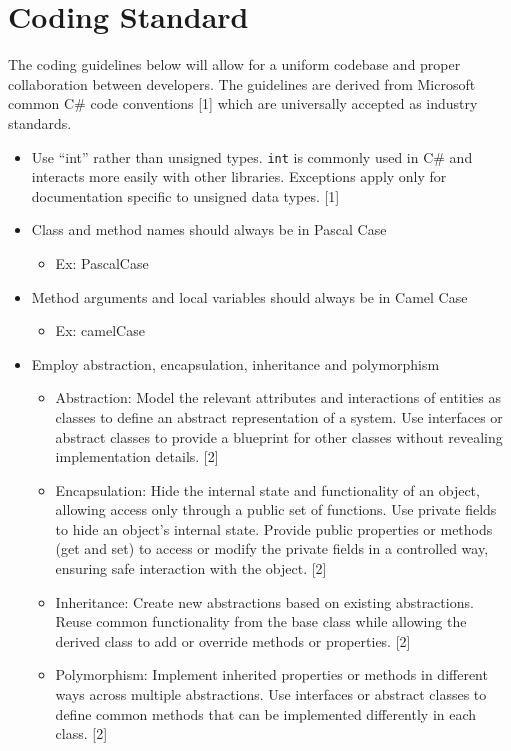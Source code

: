 \documentclass{article}
\begin{document}
\section{Coding Standard}


The coding guidelines below will allow for a uniform codebase and proper collaboration between developers. The guidelines are derived from Microsoft common C\# code conventions [1] which are universally accepted as industry standards.

\begin{itemize}

  \item Use ``int'' rather than unsigned types. \texttt{int} is commonly used in C\# and interacts more easily with other libraries. Exceptions apply only for documentation specific to unsigned data types. [1]
  \item Class and method names should always be in Pascal Case
  \begin{itemize}
    \item Ex: PascalCase
  \end{itemize}
  \item Method arguments and local variables should always be in Camel Case
  \begin{itemize}
    \item Ex: camelCase
  \end{itemize}
  \item Employ abstraction, encapsulation, inheritance and polymorphism

  \begin{itemize}
    \item Abstraction: Model the relevant attributes and interactions of entities as classes to define an abstract representation of a system. Use interfaces or abstract classes to provide a blueprint for other classes without revealing implementation details. [2]
    \item Encapsulation: Hide the internal state and functionality of an object, allowing access only through a public set of functions. Use private fields to hide an object's internal state. Provide public properties or methods (get and set) to access or modify the private fields in a controlled way, ensuring safe interaction with the object. [2]
    \item Inheritance: Create new abstractions based on existing abstractions. Reuse common functionality from the base class while allowing the derived class to add or override methods or properties. [2]
    \item Polymorphism: Implement inherited properties or methods in different ways across multiple abstractions. Use interfaces or abstract classes to define common methods that can be implemented differently in each class. [2]


\end{itemize}
\end{itemize}
\end{document}
